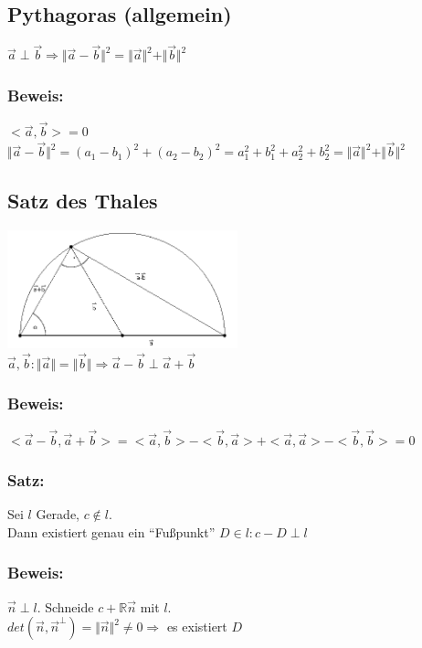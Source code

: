 \subsection{Pythagoras (allgemein)}
$\vec{a}\perp\vec{b} \Rightarrow \Vert \vec{a} - \vec{b} \Vert^{2} = \Vert \vec{a} \Vert^{2} + \Vert \vec{b} \Vert ^{2}$
%
%
%
\subsubsection{Beweis:}
$<\vec{a},\vec{b}>=0 $\\
$\Vert \vec{a} - \vec{b} \Vert^{2} = (a_{1}-b_{1})^{2} + (a_{2} - b_{2})^{2} = a_{1}^{2}+b_{1}^{2}+a_{2}^{2}+b_{2}^{2} = \Vert \vec{a} \Vert^{2} + \Vert \vec{b} \Vert^{2}$
%
%
%
\subsection{Satz des Thales}
\includegraphics[width=0.5\textwidth]
	{mainmatter/chapter1/pics/satzdesthales.png}\\
	
$\vec{a},\vec{b}: \Vert \vec{a} \Vert =\Vert \vec{b} \Vert \Rightarrow \vec{a} - \vec{b} \perp  \vec{a} + \vec{b}$
%
%
%
\subsubsection{Beweis:}
$<\vec{a}-\vec{b},\vec{a} + \vec{b}> = <\vec{a},\vec{b}>-<\vec{b},\vec{a}>+<\vec{a},\vec{a}>-<\vec{b},\vec{b}>=0$
%
%
%
\subsubsection{Satz:}
Sei $l$ Gerade, $c \notin l$. \\
Dann existiert genau ein "`Fußpunkt"' $D \in l: c-D\perp l$
%
%
%
\subsubsection{Beweis:}
$\vec{n} \perp l$. Schneide $c+ \mathbb{R}\vec{n}$  mit $l$. \\
$det(\vec{n},\vec{n}^{\perp})=\Vert \vec{n}\Vert^{2} \neq 0 \Rightarrow$ es existiert $D$ 
%
%
%
